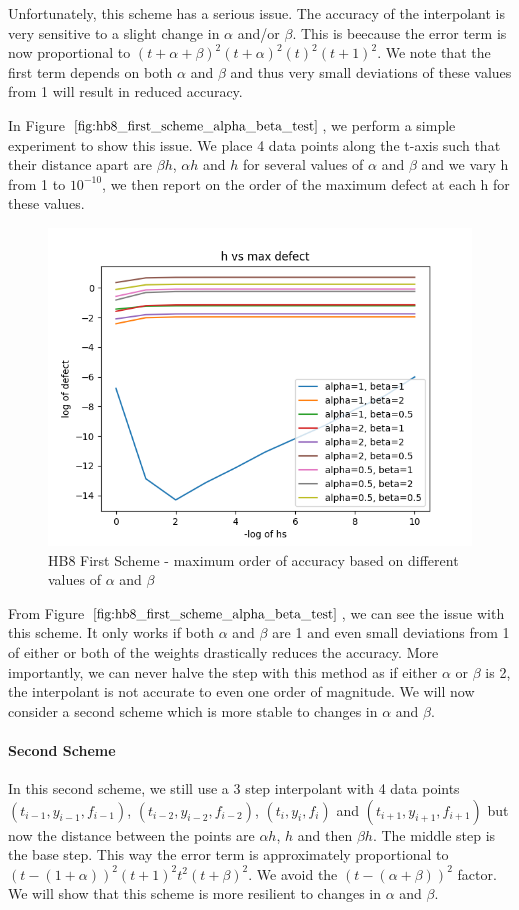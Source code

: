 \documentclass{article}
\begin{document}
Unfortunately, this scheme has a serious issue. The accuracy of the interpolant is very sensitive to a slight change in $\alpha$ and/or $\beta$. This is beecause the error term is now proportional to $(t + \alpha + \beta)^2(t+\alpha)^2(t)^2(t+1)^2$. We note that the first term depends on both $\alpha$ and $\beta$ and thus very small deviations of these values from 1 will result in reduced accuracy. 

In Figure $\ref{fig:hb8_first_scheme_alpha_beta_test}$, we perform a simple experiment to show this issue. We place 4 data points along the t-axis such that their distance apart are $\beta h$, $\alpha h$ and $h$ for several values of $\alpha$ and $\beta$ and we vary h from 1 to $10^{-10}$, we then report on the order of the maximum defect at each h for these values.

\begin{figure}[H]
\centering
\includegraphics[width=0.7\linewidth]{./figures/hb8_first_scheme_alpha_beta_test}
\caption{HB8 First Scheme - maximum order of accuracy based on different values of $\alpha$ and $\beta$}
\label{fig:hb8_first_scheme_alpha_beta_test}
\end{figure}

From Figure $\ref{fig:hb8_first_scheme_alpha_beta_test}$, we can see the issue with this scheme. It only works if both $\alpha$ and $\beta$ are 1 and even small deviations from 1 of either or both of the weights drastically reduces the accuracy. More importantly, we can never halve the step with this method as if either $\alpha$ or $\beta$ is 2, the interpolant is not accurate to even one order of magnitude. We will now consider a second scheme which is more stable to changes in $\alpha$ and $\beta$.

\paragraph{Second Scheme}
In this second scheme, we still use a 3 step interpolant with 4 data points $(t_{i-1}, y_{i-1}, f_{i-1})$, $(t_{i-2}, y_{i-2}, f_{i-2})$, $(t_{i}, y_{i}, f_{i})$ and $(t_{i+1}, y_{i+1}, f_{i+1})$ but now the distance between the points are $\alpha h$, $h$ and then $\beta h$. The middle step is the base step. This way the error term is approximately proportional to $(t- (1+\alpha))^2(t+1)^2t^2(t+\beta)^2$. We avoid the $(t-(\alpha+\beta))^2$ factor. We will show that this scheme is more resilient to changes in $\alpha$ and $\beta$.
\end{document}
